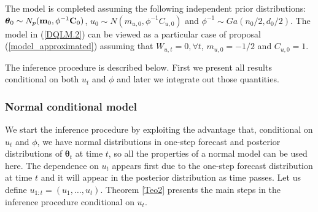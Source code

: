 \documentclass[12pt,a4paper]{article}\usepackage[]{graphicx}\usepackage[]{color}\usepackage{subfigure}
\newcommand{\bftheta}{\boldsymbol{\theta}}
\begin{document}
The model is completed assuming the following independent prior distributions: 
$ \bftheta_0\sim N_p({\bf m}_{0},\phi^{-1} {\bf C}_{0})$, $u_0 \sim N(m_{u,0},\phi^{-1} C_{u,0})$ 
and  $\phi^{-1} \sim Ga(n_0/2, d_0/2).$
The model in (\ref{DQLM.2}) can be viewed as a particular case of proposal (\ref{model_approximated}) assuming that 
$W_{u,t}=0, \forall t$, $m_{u,0}=-1/2$ and $C_{u,0}=1$.

The inference procedure is described below. First we present all results conditional on both $u_t$ and $\phi$ and later we integrate out those quantities.  


  \medskip
\noindent
\subsubsection{Normal conditional  model}

We start the inference procedure by exploiting the advantage that, conditional on $u_t$ and $\phi$, we have normal distributions in one-step forecast and posterior distributions of $\bftheta_t$ at time $t$, so all the properties of a normal model can be used here. 
The dependence on $u_t$ appears first due to the one-step forecast distribution at time $t$ and it will appear in the posterior distribution as time passes. 
Let us define $u_{1:t} = (u_1,\dots,u_t).$ 
Theorem \ref{Teo2} presents the main steps in the inference procedure conditional on $u_t$.
  
\end{document}
